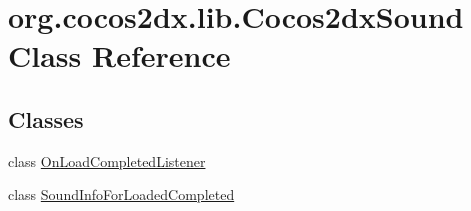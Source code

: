 \hypertarget{classorg_1_1cocos2dx_1_1lib_1_1Cocos2dxSound}{}\section{org.\+cocos2dx.\+lib.\+Cocos2dx\+Sound Class Reference}
\label{classorg_1_1cocos2dx_1_1lib_1_1Cocos2dxSound}
\subsection*{Classes}
\begin{DoxyCompactItemize}
\item 
class \hyperlink{classorg_1_1cocos2dx_1_1lib_1_1Cocos2dxSound_1_1OnLoadCompletedListener}{On\+Load\+Completed\+Listener}
\item 
class \hyperlink{classorg_1_1cocos2dx_1_1lib_1_1Cocos2dxSound_1_1SoundInfoForLoadedCompleted}{Sound\+Info\+For\+Loaded\+Completed}
\end{DoxyCompactItemize}
